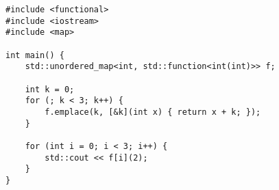 \begin{lstlisting}[title=\href{https://godbolt.org/z/hzTPK3}{\texttt{godbolt.org/z/hzTPK3}}]
#include <functional>
#include <iostream>
#include <map>

int main() {
    std::unordered_map<int, std::function<int(int)>> f;
    
    int k = 0;
    for (; k < 3; k++) {
        f.emplace(k, [&k](int x) { return x + k; });
    }

    for (int i = 0; i < 3; i++) {
        std::cout << f[i](2);
    }
}
\end{lstlisting}
